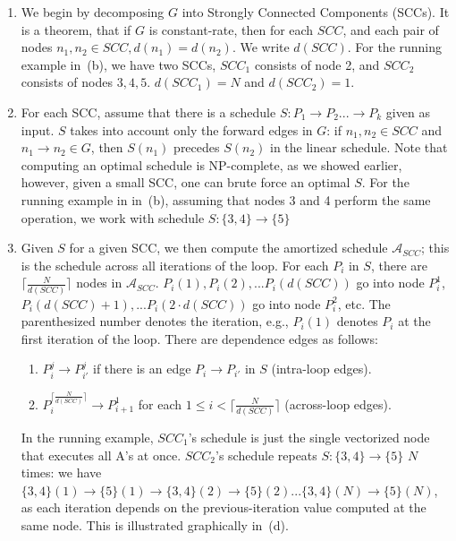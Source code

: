 \documentclass[sigconf, screen, natbib=false, dvipsnames, table]{acmart}
\theoremstyle{definition}
\begin{document}
\begin{enumerate}

\item We begin by decomposing $G$ into Strongly Connected Components (SCCs). It is a theorem, that if $G$ is constant-rate, 
then for each $\mathit{SCC}$, and each pair of nodes $n_1, n_2 \in \mathit{SCC}, d(n_1) = d(n_2)$. We write $d(\mathit{SCC})$.
For the running example in~(b), we have two SCCs, $SCC_1$ consists of node 2, and $SCC_2$ 
consists of nodes $3,4,5$. $d(\mathit{SCC}_1) = N$ and $d(\mathit{SCC}_2) = 1$.

\item For each SCC, assume that there is a schedule $S: P_1 \rightarrow P_2 ... \rightarrow P_k$ given 
as input. $S$ takes into account only the forward edges in $G$: if $n_1, n_2 \in SCC$ and $n_1 \rightarrow n_2 \in G$, 
then $S(n_1)$ precedes $S(n_2)$ in the linear schedule. Note that computing an optimal schedule is NP-complete, 
as we showed earlier, however, given a small SCC, one can brute force an optimal $S$. For the running example in 
in~(b), assuming that nodes 3 and 4 perform the same operation, we work with schedule 
$S: \{3,4\} \rightarrow \{5\}$

\item Given $S$ for a given SCC, we then compute the amortized schedule $\mathcal{A}_{\mathit{SCC}}$; 
this is the schedule across all iterations of the loop. For each $P_i$ in $S$, there are $\lceil{\frac{N}{d(SCC)}}\rceil$
nodes in $\mathcal{A}_{\mathit{SCC}}$. $P_i(1),P_i(2),...P_i(d(SCC))$ go into node $P^1_i$, $P_i(d(SCC)+1),...P_i(2\cdot d(SCC))$ 
go into node $P^2_i$, etc. The parenthesized number denotes the iteration, e.g., $P_i(1)$ denotes $P_i$ at the first iteration 
of the loop. There are dependence edges as follows:
\begin{enumerate}
\item $P^j_i \rightarrow P^j_{i'}$ if there is an edge $P_i \rightarrow P_{i'}$ in $S$ (intra-loop edges).
\item $P^{\lceil{\frac{N}{d(SCC)}}\rceil}_i \rightarrow P^1_{i+1}$ for each $1 \le i < \lceil{\frac{N}{d(SCC)}}\rceil$ (across-loop edges).
\end{enumerate}
In the running example, $SCC_1$'s schedule is just the single vectorized node that executes all A's at once.
$SCC_2$'s schedule repeats $S: \{3,4\} \rightarrow \{5\}$ $N$ times: we have $\{3,4\}(1) \rightarrow \{5\}(1) \rightarrow \{3,4\}(2) \rightarrow \{5\}(2) ... \{3,4\}(N) \rightarrow \{5\}(N)$, 
as each iteration depends on the previous-iteration value computed at the same node.
This is illustrated graphically in~(d).



\end{enumerate}
\end{document}
